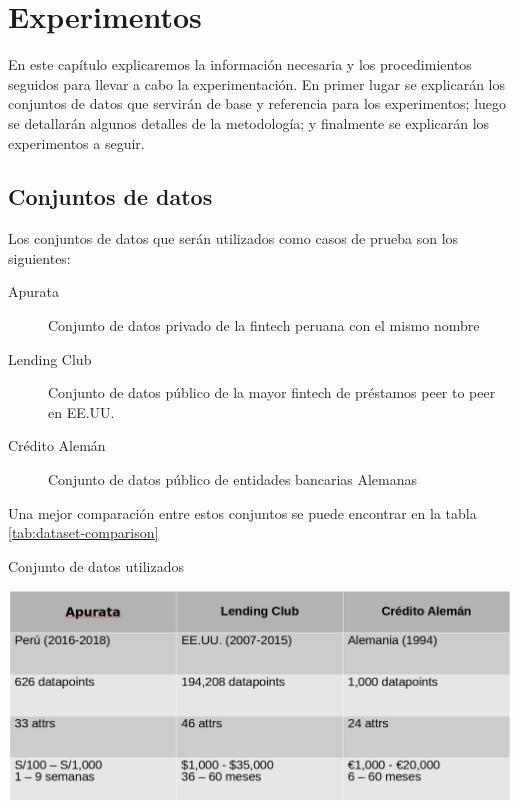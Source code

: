 \chapter{Experimentos}


En este capítulo explicaremos la información necesaria y los procedimientos seguidos para llevar a cabo la experimentación. En primer lugar se explicarán los conjuntos de datos que servirán de base y referencia para los experimentos; luego se detallarán algunos detalles de la metodología; y finalmente se explicarán los experimentos a seguir.

\section{Conjuntos de datos}

Los conjuntos de datos que serán utilizados como casos de prueba son los siguientes:

\begin{description}
    \item[Apurata] Conjunto de datos privado de la fintech peruana con el mismo nombre
    \item[Lending Club] Conjunto de datos público de la mayor fintech de préstamos peer to peer en EE.UU.
    \item[Crédito Alemán] Conjunto de datos público de entidades bancarias Alemanas
\end{description}

Una mejor comparación entre estos conjuntos se puede encontrar en la tabla \ref{tab:dataset-comparison}

\begin{table}
    \centering
    \caption{Conjunto de datos utilizados}
    \label{tab:dataset-comparison}
    \includegraphics[width=0.8\linewidth]{graficos/dataset_comparison.png}
\end{table}

